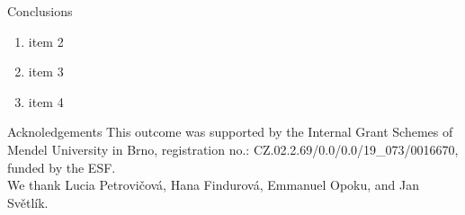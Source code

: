\documentclass[final]{beamer}
\newlength{\sepwidth}
\newcommand{\separatorcolumn}{\begin{column}{\sepwidth}\end{column}}
\begin{document}
\begin{frame}[t]
\begin{columns}[c]
\begin{column}{0.96\paperwidth}
\begin{block}{Conclusions}
    \begin{enumerate}
        \item item 2
        \item item 3
        \item item 4
    \end{enumerate}

\end{block}

\begin{block}{Acknoledgements}
\small \centering
    This outcome was supported by the Internal Grant Schemes of Mendel University in Brno, registration no.: CZ.02.2.69/0.0/0.0/19\_073/0016670, funded by the ESF. \\
    We thank Lucia Petrovičová, Hana Findurová, Emmanuel Opoku, and Jan Světlík.
\end{block}

\end{column}
%
%
\end{columns}
\end{frame}
\end{document}
